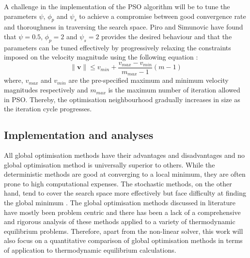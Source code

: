 	A challenge in the implementation of the PSO algorithm will be to tune the parameters $\psi$, $\phi_p$ and $\psi_s$ to achieve a compromise between good convergence rate and thoroughness in traversing the search space. Piro and Simunovic \cite{Piro16} have found that $\psi=0.5$, $\phi_p=2$ and $\psi_s=2$ provides the desired behaviour and that the parameters can be tuned effectively by progressively relaxing the constraints imposed on the velocity magnitude using the following equation \cite{Nocedal06}:
	\begin{equation}\label{eq:PSOvel}
		\|\mathbf{v}\| \leq v_{min} + \frac{v_{max}-v_{min}}{m_{max} - 1} (m-1)
	\end{equation}
	where, $v_{max}$ and $v_{min}$ are the pre-specified maximum and minimum velocity magnitudes respectively and $m_{max}$ is the maximum number of iteration allowed in PSO. Thereby, the optimisation neighbourhood gradually increases in size as the iteration cycle progresses.
	
	
	\subsection{Implementation and analyses}
	All global optimisation methods have their advantages and disadvantages and no global optimisation method is universally superior to others. While the deterministic methods are good at converging to a local minimum, they are often prone to high computational expenses. The stochastic methods, on the other hand, tend to cover the search space more effectively but face difficulty at finding the global minimum \cite{Piro16}. The global optimisation methods discussed in literature have mostly been problem centric and there has been a lack of a comprehensive and rigorous analysis of these methods applied to a variety of thermodynamic equilibrium problems. Therefore, apart from the non-linear solver, this work will also focus on a quantitative comparison of global optimisation methods in terms of application to thermodynamic equilibrium calculations. 
	
